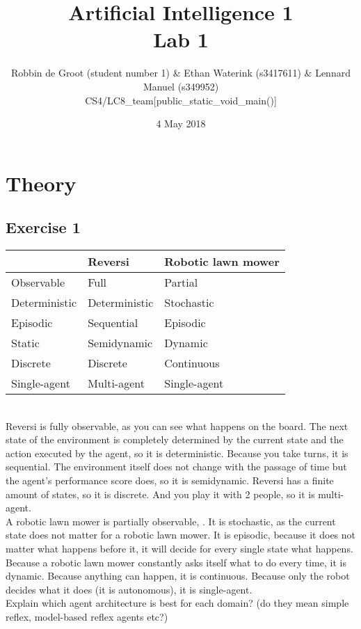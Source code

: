 \documentclass{article}
\title{Artificial Intelligence 1 \\ Lab 1}%
\author{Robbin de Groot (student number 1) \& Ethan Waterink (s3417611) \& Lennard Manuel (s349952) \\ CS4/LC8\_team[public\_static\_void\_main()]} %
\date{4 May 2018}%
\begin{document}
	
	\section*{Theory}
	\subsection*{Exercise 1}
	\begin{tabular}{ | l | l  l |}
		\hline
		& Reversi & Robotic lawn mower \\ \hline
		Observable & Full & Partial\\ 
		Deterministic & Deterministic & Stochastic\\ 
		Episodic & Sequential & Episodic\\ 
		Static & Semidynamic & Dynamic\\ 
		Discrete & Discrete & Continuous\\ 
		Single-agent & Multi-agent & Single-agent\\ \hline
	\end{tabular}\\
	Reversi is fully observable, as you can see what happens on the board. The next state of the environment is completely determined by the current state and the action executed by the agent, so it is deterministic. Because you take turns, it is sequential. The environment itself does not change with the passage of time but the agent’s performance score does, so it is semidynamic. Reversi has a finite amount of states, so it is discrete. And you play it with 2 people, so it is multi-agent. \\
	A robotic lawn mower is partially observable, . It is stochastic, as the current state does not matter for a robotic lawn mower. It is episodic, because it does not matter what happens before it, it will decide for every single state what happens. Because a robotic lawn mower constantly asks itself what to do every time, it is dynamic. Because anything can happen, it is continuous. Because only the robot decides what it does (it is autonomous), it is single-agent.
	\\
	Explain which agent architecture is best for each domain? (do they mean simple reflex, model-based reflex agents etc?)
	
\end{document}

